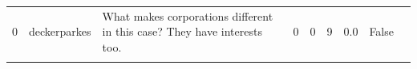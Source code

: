 \documentclass[a4paper]{article}
\begin{document}
\begin{table}
\begin{tabularx}{\textwidth}{@{}llLllllll@{}}
        0  & deckerparkes   & What makes corporations different in this case? They have interests too.                                                                                                                                                                                                                                                                                                                                                                                                                                                                                                                                                                                                                                                                                                                                                                                                                                                                                                                                                                                                                                                                                                                                                                                                                                                                                                                                                                                                                                                                                                                    & 0        & 0     & 9   & 0.0            & False       \\       \\

\end{tabularx}
\end{table}
\end{document}
